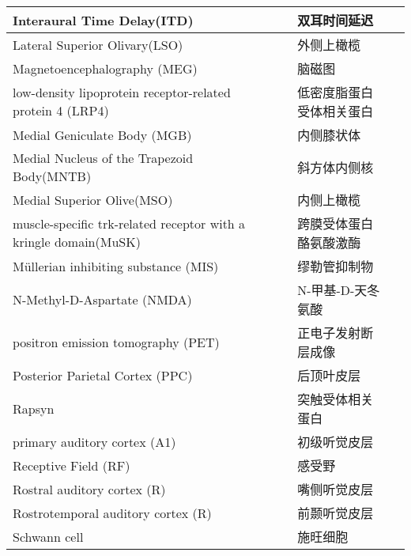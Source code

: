 \begin{table}[htbp]
{\begin{tabular}{llll}
		\midrule
		Interaural Time 		Delay(ITD)   && 双耳时间延迟  \\
		
		\midrule
		Lateral Superior Olivary(LSO)   && 外侧上橄榄  \\
		
			
		\midrule
		Magnetoencephalography (MEG)   && 脑磁图  \\
		
		\midrule
		low-density lipoprotein receptor-related protein 4 (LRP4)   && 低密度脂蛋白受体相关蛋白  \\
		
		\midrule
		Medial Geniculate Body (MGB)   && 内侧膝状体  \\
		
		\midrule
		Medial Nucleus of the Trapezoid Body(MNTB)   && 斜方体内侧核  \\
		
		\midrule
		Medial Superior 		Olive(MSO)   && 内侧上橄榄  \\
		
		\midrule
		muscle-specific trk-related receptor with a
		kringle domain(MuSK)   && 跨膜受体蛋白酪氨酸激酶  \\
		
		\midrule
		Müllerian inhibiting substance (MIS)   && 缪勒管抑制物  \\
		
		\midrule
		N-Methyl-D-Aspartate (NMDA)   && N-甲基-D-天冬氨酸  \\
		
		\midrule
		positron emission tomography (PET)     && 正电子发射断层成像   \\
		
		\midrule
		Posterior Parietal Cortex (PPC)     && 后顶叶皮层   \\
		
		\midrule
		Rapsyn   && 突触受体相关蛋白  \\
		
		\midrule
		primary auditory cortex (A1)   && 初级听觉皮层  \\
		
		\midrule
		Receptive Field (RF)   && 感受野  \\
		
		\midrule
		Rostral auditory cortex (R)   && 嘴侧听觉皮层  \\
		
		\midrule
		Rostrotemporal auditory cortex (R)   && 前颞听觉皮层 \\
		
		\midrule
		Schwann cell   && 施旺细胞 \\
		

\end{tabular}}
\end{table}
